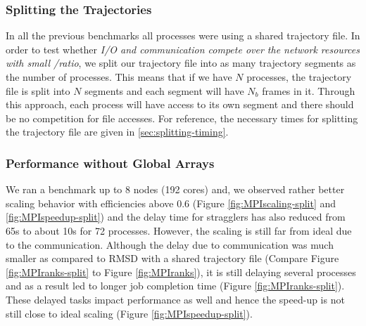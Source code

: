 \subsubsection{Splitting the Trajectories}
\label{splitting-traj}
In all the previous benchmarks all processes were using a shared trajectory file.
In order to test whether \emph{I/O and communication compete over the network resources with small \tcomp/\tIO ratio}, we split our trajectory file into as many trajectory segments as the number of processes.
This means that if we have $N$ processes, the trajectory file is split into $N$ segments and each segment will have $N_{b}$ frames in it. 
Through this approach, each process will have access to its own segment and there should be no competition for file accesses. 
For reference, the necessary times for splitting the trajectory file are given in \ref{sec:splitting-timing}.

\subsubsection*{Performance without Global Arrays}
We ran a benchmark up to 8 nodes (192 cores) and, we observed rather better scaling behavior with efficiencies above 0.6 (Figure \ref{fig:MPIscaling-split} and \ref{fig:MPIspeedup-split}) and the delay time for stragglers has also reduced from 65s to about 10s for 72 processes. 
However, the scaling is still far from ideal due to the communication. 
Although the delay due to communication was much smaller as compared to RMSD with a shared trajectory file (Compare Figure \ref{fig:MPIranks-split} to Figure \ref{fig:MPIranks}), it is still delaying several processes and as a result led to longer job completion time (Figure \ref{fig:MPIranks-split}). 
These delayed tasks impact performance as well and hence the speed-up is not still close to ideal scaling (Figure \ref{fig:MPIspeedup-split}).

